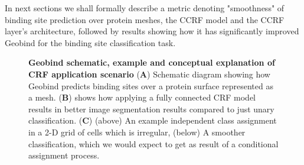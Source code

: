 In next sections we shall formally describe a metric  denoting "smoothness" of binding site
prediction over protein meshes, the CCRF model and the CCRF layer's architecture, followed
by results showing how it has significantly improved Geobind for the binding site classification task.
\begin{center} 
 \begin{figure}[!htp]
        \caption[Geobind schematic, example and conceptual explanation of CRF application scenario]{\textbf{Geobind schematic, example and conceptual explanation of CRF application scenario}
        ({\bf A}) Schematic diagram showing how Geobind predicts binding sites over a protein surface represented as a mesh. ({\bf B}) \citet{krahenbuhl2012efficient} shows how applying a fully connected CRF model results in better image segmentation results compared to 
        just unary classification. ({\bf C}) (above) An example independent class assignment in a 2-D grid of cells which is irregular, (below) A smoother classification, which we would 
        expect to get as result of a conditional assignment process.}
        \label{fig:crf_concept} \end{figure} \end{center}
